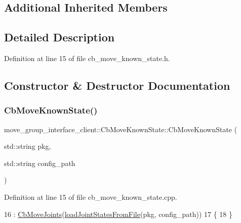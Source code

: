 \subsection*{Additional Inherited Members}


\subsection{Detailed Description}


Definition at line 15 of file cb\+\_\+move\+\_\+known\+\_\+state.\+h.



\subsection{Constructor \& Destructor Documentation}
\mbox{\label{classmove__group__interface__client_1_1CbMoveKnownState_a40ec0e13fe77943e15ab83b5d7aca7ac}} 
\subsubsection{\texorpdfstring{Cb\+Move\+Known\+State()}{CbMoveKnownState()}}
{\footnotesize\ttfamily move\+\_\+group\+\_\+interface\+\_\+client\+::\+Cb\+Move\+Known\+State\+::\+Cb\+Move\+Known\+State (\begin{DoxyParamCaption}\item[{std\+::string}]{pkg,  }\item[{std\+::string}]{config\+\_\+path }\end{DoxyParamCaption})}



Definition at line 15 of file cb\+\_\+move\+\_\+known\+\_\+state.\+cpp.


\begin{DoxyCode}
16   : \hyperlink{classmove__group__interface__client_1_1CbMoveJoints_a946c2fd5f9b5415fa9b6a5976fe1b750}{CbMoveJoints}(\hyperlink{classmove__group__interface__client_1_1CbMoveKnownState_af00c5ee81dfa5dd0817135279df09d74}{loadJointStatesFromFile}(pkg, config\_path))
17 \{
18 \}
\end{DoxyCode}


